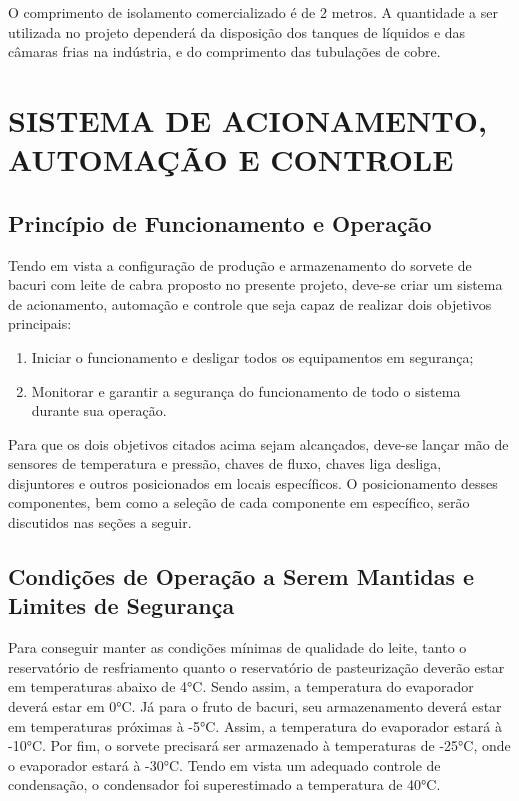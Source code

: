 \documentclass[10pt,a4paper]{article}
\begin{document}
O comprimento de isolamento comercializado é de 2 metros. A quantidade a ser utilizada no projeto dependerá da disposição dos tanques de líquidos e das câmaras frias na indústria, e do comprimento das tubulações de cobre.

\newpage
\section{{ SISTEMA DE ACIONAMENTO, AUTOMAÇÃO E CONTROLE}}

\subsection{{Princípio de Funcionamento e Operação}}

Tendo em vista a configuração de produção e armazenamento do sorvete de bacuri com leite de cabra proposto no presente projeto, deve-se criar um sistema de acionamento, automação e controle que seja capaz de realizar dois objetivos principais:

\begin{enumerate}
    \item Iniciar o funcionamento e desligar todos os equipamentos em segurança;
    \item Monitorar e garantir a segurança do funcionamento de todo o sistema durante sua operação.
\end{enumerate}

Para que os dois objetivos citados acima sejam alcançados, deve-se lançar mão de sensores de temperatura e pressão, chaves de fluxo, chaves liga desliga, disjuntores e outros posicionados em locais específicos. O posicionamento desses componentes, bem como a seleção de cada componente em específico, serão discutidos nas seções a seguir.

\subsection{{Condições de Operação a Serem Mantidas e Limites de Segurança}}

Para conseguir manter as condições mínimas de qualidade do leite, tanto o reservatório de resfriamento quanto o reservatório de pasteurização deverão estar em temperaturas abaixo de 4°C. Sendo assim, a temperatura do evaporador deverá estar em 0°C. Já para o fruto de bacuri, seu armazenamento deverá estar em temperaturas próximas à -5°C. Assim, a temperatura do evaporador estará à -10°C. Por fim, o sorvete precisará ser armazenado à temperaturas de -25°C, onde o evaporador estará à -30°C. Tendo em vista um adequado controle de condensação, o condensador foi superestimado a temperatura de 40°C.
\end{document}
